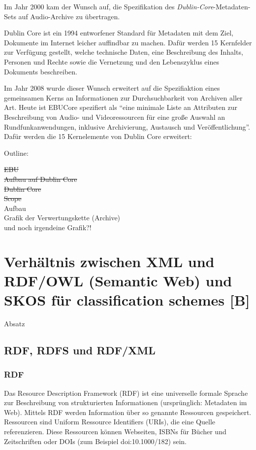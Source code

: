 	
	Im Jahr 2000 kam der Wunsch auf, die Spezifikation des \emph{Dublin-Core}-Metadaten-Sets auf Audio-Archive zu übertragen. 	%

	Dublin Core ist ein 1994 entworfener Standard für Metadaten mit dem Ziel, Dokumente im Internet leicher auffindbar zu machen. Dafür werden 15 Kernfelder zur Verfügung gestellt, welche technische Daten, eine Beschreibung des Inhalts, Personen und Rechte sowie die Vernetzung und den Lebenszyklus eines Dokuments beschreiben.
	
	
	Im Jahr 2008 wurde dieser Wunsch erweitert auf die Spezifiaktion eines gemeinsamen Kerns an Informationen zur Durchsuchbarkeit von Archiven aller Art. Heute ist EBUCore spezifiert als \enquote{eine minimale Liste an Attributen zur Beschreibung von Audio- und Videoressourcen für eine große Auswahl an Rundfunkanwendungen, inklusive Archivierung, Austausch und Veröffentlichung}. Dafür werden die 15 Kernelemente von Dublin Core erweitert:
	
	Outline:
	
	\sout{EBU} \\
	\sout{Aufbau auf Dublin Core} \\
	\sout{Dublin Core} \\
	\sout{Scope} \\
	Aufbau \\
	Grafik der Verwertungskette (Archive) \\
	und noch irgendeine Grafik?! 
	
	
	\newpage
			
	\balance
	\section{Verhältnis zwischen XML und RDF/OWL (Semantic Web) und SKOS für classification schemes [B]}
	Absatz

	\subsection{RDF, RDFS und RDF/XML}
	\subsubsection{RDF}
	Das Resource Description Framework (RDF) ist eine universelle formale Sprache zur Beschreibung von strukturierten Informationen (ursprünglich: Metadaten im Web). Mittels RDF werden Information über so genannte Ressourcen gespeichert. Ressourcen sind Uniform Ressource Identifiers (URIs), die eine Quelle referenzieren. Diese Ressourcen können Webseiten, ISBNs für Bücher und Zeitschriften oder DOIs (zum Beispiel doi:10.1000/182) sein.
	
